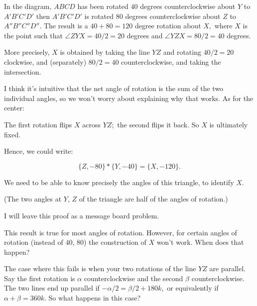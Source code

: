 In the diagram, $ABCD$ has been rotated $40$ degrees counterclockwise about $Y$ to $A'B'C'D'$ then $A'B'C'D'$ is rotated $80$ degrees counterclockwise about $Z$ to $A''B''C''D''.$  The result is a $40+80 = 120$ degree rotation about $X,$ where $X$ is the point such that $\angle ZYX = 40/2 = 20$ degrees and $\angle YZX = 80/2 = 40$ degrees.

More precisely, $X$ is obtained by taking the line $YZ$ and rotating $40/2=20$ clockwise, and (separately) $80/2=40$ counterclockwise, and taking the intersection.

I think it's intuitive that the net angle of rotation is the sum of the two individual angles, so we won't worry about explaining why that works.  As for the center:

The first rotation flips $X$ across $YZ;$ the second flips it back. So $X$ is ultimately fixed.

Hence, we could write:

$$\{Z,-80\} * \{Y,-40\} = \{X,-120\}.$$

We need to be able to know precisely the angles of this triangle, to identify  $X$.

(The two angles at  $Y$, $Z$ of the triangle are half of the angles of rotation.)

I will leave this proof as a message board problem.

This result is true for most angles of rotation. However, for certain angles of rotation (instead of $40$, $80$) the construction of $X$ won't work. When does that happen?


The case where this fails is when your two rotations of the line $YZ$ are parallel. Say the first rotation is $\alpha$ counterclockwise and the second $\beta$ counterclockwise. The two lines end up parallel if $-\alpha/2 = \beta/2 + 180k,$ or equivalently if $\alpha+\beta = 360k.$  So what happens in this case?

